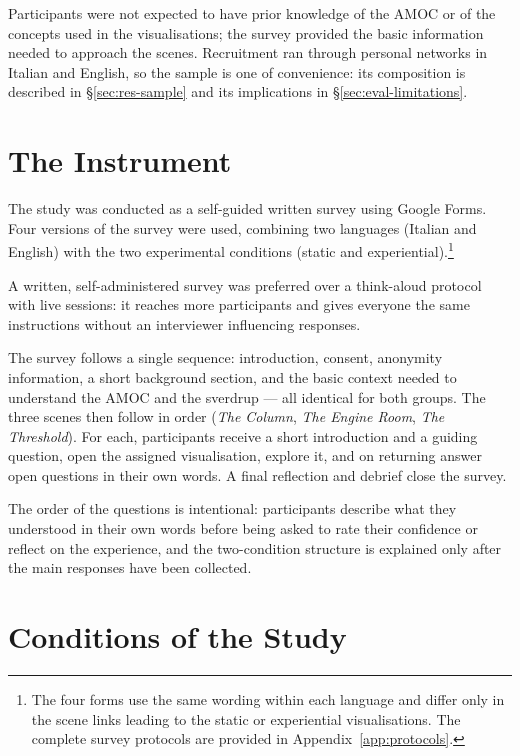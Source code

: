 Participants were not expected to have prior knowledge of the AMOC or of the concepts used in the visualisations; the survey provided the basic information needed to approach the scenes. Recruitment ran through personal networks in Italian and English, so the sample is one of convenience: its composition is described in \S\ref{sec:res-sample} and its implications in \S\ref{sec:eval-limitations}.

\section{The Instrument}
\label{sec:eval-instrument}

The study was conducted as a self-guided written survey using Google Forms. Four versions of the survey were used, combining two languages (Italian and English) with the two experimental conditions (static and experiential).\footnote{The four forms use the same wording within each language and differ only in the scene links leading to the static or experiential visualisations. The complete survey protocols are provided in Appendix~\ref{app:protocols}.}



A written, self-administered survey was preferred over a think-aloud protocol with live sessions: it reaches more participants and gives everyone the same instructions without an interviewer influencing responses.

The survey follows a single sequence: introduction, consent, anonymity information, a short background section, and the basic context needed to understand the AMOC and the sverdrup --- all identical for both groups. The three scenes then follow in order (\textit{The Column}, \textit{The Engine Room}, \textit{The Threshold}). For each, participants receive a short introduction and a guiding question, open the assigned visualisation, explore it, and on returning answer open questions in their own words. A final reflection and debrief close the survey.

The order of the questions is intentional: participants describe what they understood in their own words before being asked to rate their confidence or reflect on the experience, and the two-condition structure is explained only after the main responses have been collected.

\section{Conditions of the Study}
\label{sec:eval-conditions}

